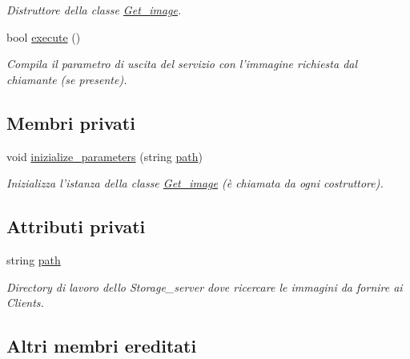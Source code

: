 \begin{DoxyCompactItemize}
\begin{DoxyCompactList}\small\item\em Distruttore della classe \hyperlink{class_get__image}{Get\-\_\-image}. \end{DoxyCompactList}\item 
bool \hyperlink{class_get__image_ab133500614b9a2e7a1215a55f8729a6b}{execute} ()
\begin{DoxyCompactList}\small\item\em Compila il parametro di uscita del servizio con l'immagine richiesta dal chiamante (se presente). \end{DoxyCompactList}\end{DoxyCompactItemize}
\subsection*{Membri privati}
\begin{DoxyCompactItemize}
\item 
void \hyperlink{class_get__image_a01517b99c0d3c7ac9a7daaf3fa7fe4fd}{inizialize\-\_\-parameters} (string \hyperlink{class_get__image_a5a2f7a3384d879568383e61151f2bf11}{path})
\begin{DoxyCompactList}\small\item\em Inizializza l'istanza della classe \hyperlink{class_get__image}{Get\-\_\-image} (è chiamata da ogni costruttore). \end{DoxyCompactList}\end{DoxyCompactItemize}
\subsection*{Attributi privati}
\begin{DoxyCompactItemize}
\item 
\hypertarget{class_get__image_a5a2f7a3384d879568383e61151f2bf11}{string \hyperlink{class_get__image_a5a2f7a3384d879568383e61151f2bf11}{path}}\label{class_get__image_a5a2f7a3384d879568383e61151f2bf11}

\begin{DoxyCompactList}\small\item\em Directory di lavoro dello {\itshape Storage\-\_\-server} dove ricercare le immagini da fornire ai {\itshape Clients}. \end{DoxyCompactList}\end{DoxyCompactItemize}
\subsection*{Altri membri ereditati}



